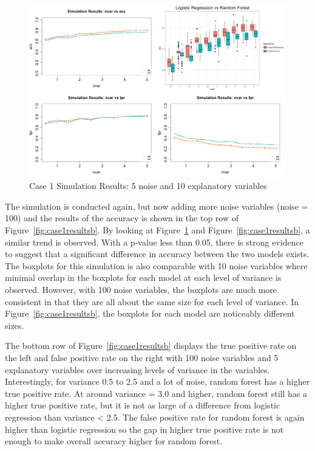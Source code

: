 \documentclass{llncs}
\begin{document}
\begin{figure}
\centering
\includegraphics[scale=0.55]{case1.png}
\caption{Case 1 Simulation Results: 5 noise and 10 explanatory variables}
\label{fig:case1results}
\end{figure}

The simulation is conducted again, but now adding more noise variables (noise = 100) and the results of the accuracy is shown in the top row of Figure~\ref{fig:case1resultsb}. By looking at Figure~\ref{fig:case1results} and Figure~\ref{fig:case1resultsb}, a similar trend is observed. With a p-value less than 0.05, there is strong evidence to suggest that a significant difference in accuracy between the two models exists. The boxplots for this simulation is also comparable with 10 noise variables where minimal overlap in the boxplots for each model at each level of variance is observed. However, with 100 noise variables, the boxplots are much more consistent in that they are all about the same size for each level of variance.  In Figure~\ref{fig:case1resultsb}, the boxplots for each model are noticeably different sizes.

The bottom row of Figure~\ref{fig:case1resultsb} displays the true positive rate on the left and false positive rate on the right with 100 noise variables and 5 explanatory variables over increasing levels of variance in the variables. Interestingly, for variance 0.5 to 2.5 and a lot of noise, random forest has a higher true positive rate.  At around variance = 3.0 and higher, random forest still has a higher true positive rate, but it is not as large of a difference from logistic regression than variance < 2.5. The false positive rate for random forest is again higher than logistic regression so the gap in higher true positive rate is not enough to make overall accuracy higher for random forest.
\end{document}
